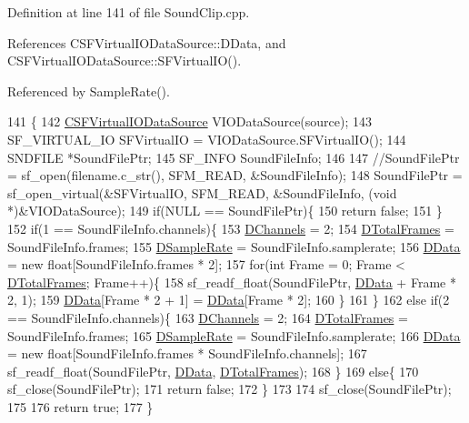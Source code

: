 Definition at line 141 of file Sound\+Clip.\+cpp.



References C\+S\+F\+Virtual\+I\+O\+Data\+Source\+::\+D\+Data, and C\+S\+F\+Virtual\+I\+O\+Data\+Source\+::\+S\+F\+Virtual\+I\+O().



Referenced by Sample\+Rate().


\begin{DoxyCode}
141                                                         \{
142     \hyperlink{classCSFVirtualIODataSource}{CSFVirtualIODataSource} VIODataSource(source);
143     SF\_VIRTUAL\_IO SFVirtualIO = VIODataSource.SFVirtualIO();
144     SNDFILE *SoundFilePtr;
145     SF\_INFO SoundFileInfo;
146     
147     \textcolor{comment}{//SoundFilePtr = sf\_open(filename.c\_str(), SFM\_READ, &SoundFileInfo);}
148     SoundFilePtr = sf\_open\_virtual(&SFVirtualIO, SFM\_READ, &SoundFileInfo, (\textcolor{keywordtype}{void} *)&VIODataSource);
149     \textcolor{keywordflow}{if}(NULL == SoundFilePtr)\{
150         \textcolor{keywordflow}{return} \textcolor{keyword}{false};
151     \}
152     \textcolor{keywordflow}{if}(1 == SoundFileInfo.channels)\{
153         \hyperlink{classCSoundClip_a01aaf0b87b9b8226c77a6931d03d6a64}{DChannels} = 2;
154         \hyperlink{classCSoundClip_ab0d9eb261d09fa2a106658276f37285b}{DTotalFrames} = SoundFileInfo.frames;
155         \hyperlink{classCSoundClip_ac1b9306140da2f89f6178833e0a9b887}{DSampleRate} = SoundFileInfo.samplerate;
156         \hyperlink{classCSoundClip_a220921a0c81e5c63e2cd3c55c75878b1}{DData} = \textcolor{keyword}{new} \textcolor{keywordtype}{float}[SoundFileInfo.frames * 2];
157         \textcolor{keywordflow}{for}(\textcolor{keywordtype}{int} Frame = 0; Frame < \hyperlink{classCSoundClip_ab0d9eb261d09fa2a106658276f37285b}{DTotalFrames}; Frame++)\{
158             sf\_readf\_float(SoundFilePtr, \hyperlink{classCSoundClip_a220921a0c81e5c63e2cd3c55c75878b1}{DData} + Frame * 2, 1);   
159             \hyperlink{classCSoundClip_a220921a0c81e5c63e2cd3c55c75878b1}{DData}[Frame * 2 + 1] = \hyperlink{classCSoundClip_a220921a0c81e5c63e2cd3c55c75878b1}{DData}[Frame * 2];
160         \}
161     \}
162     \textcolor{keywordflow}{else} \textcolor{keywordflow}{if}(2 == SoundFileInfo.channels)\{
163         \hyperlink{classCSoundClip_a01aaf0b87b9b8226c77a6931d03d6a64}{DChannels} = 2;
164         \hyperlink{classCSoundClip_ab0d9eb261d09fa2a106658276f37285b}{DTotalFrames} = SoundFileInfo.frames;
165         \hyperlink{classCSoundClip_ac1b9306140da2f89f6178833e0a9b887}{DSampleRate} = SoundFileInfo.samplerate;
166         \hyperlink{classCSoundClip_a220921a0c81e5c63e2cd3c55c75878b1}{DData} = \textcolor{keyword}{new} \textcolor{keywordtype}{float}[SoundFileInfo.frames * SoundFileInfo.channels];
167         sf\_readf\_float(SoundFilePtr, \hyperlink{classCSoundClip_a220921a0c81e5c63e2cd3c55c75878b1}{DData}, \hyperlink{classCSoundClip_ab0d9eb261d09fa2a106658276f37285b}{DTotalFrames});
168     \}
169     \textcolor{keywordflow}{else}\{
170         sf\_close(SoundFilePtr);
171         \textcolor{keywordflow}{return} \textcolor{keyword}{false};    
172     \}
173     
174     sf\_close(SoundFilePtr);
175     
176     \textcolor{keywordflow}{return} \textcolor{keyword}{true};
177 \}
\end{DoxyCode}
